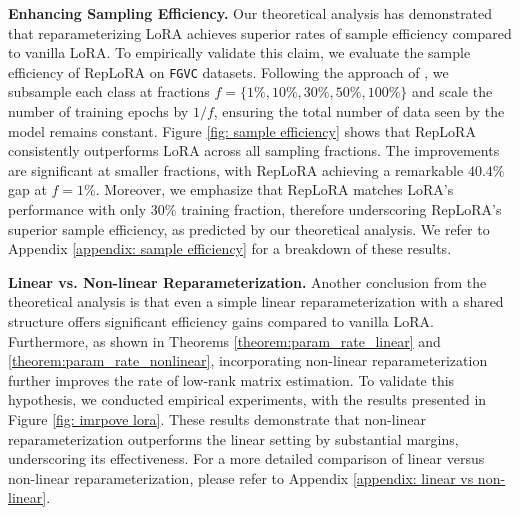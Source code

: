 %

%

\vspace{0.5 em}
\noindent
\textbf{Enhancing Sampling Efficiency.  } Our theoretical analysis has demonstrated that reparameterizing LoRA achieves superior rates of sample efficiency compared to vanilla LoRA. To empirically validate this claim, we evaluate the sample efficiency of RepLoRA on \texttt{FGVC} datasets. Following the approach of \cite{d2021convit}, we subsample each class at fractions $f = \{1\%, 10\%, 30\%, 50\%, 100\%\}$ and scale the number of training epochs by $1/f$, ensuring the total number of data seen by the model remains constant. Figure \ref{fig: sample efficiency} shows that RepLoRA consistently outperforms LoRA across all sampling fractions. The improvements are significant at smaller fractions, with RepLoRA achieving a remarkable $40.4\%$ gap at $f = 1\%$. Moreover, we emphasize that RepLoRA matches LoRA’s performance with only $30\%$ training fraction, therefore underscoring RepLoRA’s superior sample efficiency, as predicted by our theoretical analysis. We refer to Appendix \ref{appendix: sample efficiency} for a breakdown of these results.

\vspace{0.5 em}
\noindent
\textbf{Linear vs. Non-linear Reparameterization. } Another conclusion from the theoretical analysis is that even a simple linear reparameterization with a shared structure offers significant efficiency gains compared to vanilla LoRA. Furthermore, as shown in Theorems \ref{theorem:param_rate_linear} and \ref{theorem:param_rate_nonlinear}, incorporating non-linear reparameterization further improves the rate of low-rank matrix estimation. To validate this hypothesis, we conducted empirical experiments, with the results presented in Figure \ref{fig: imrpove lora}. These results demonstrate that non-linear reparameterization outperforms the linear setting by substantial margins, underscoring its effectiveness. For a more detailed comparison of linear versus non-linear reparameterization, please refer to Appendix \ref{appendix: linear vs non-linear}.